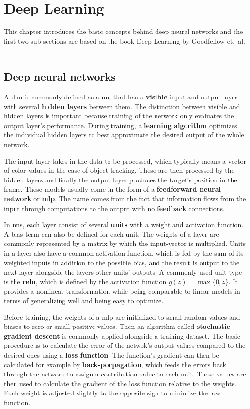 \section{Deep Learning}

This chapter introduces the basic concepts behind deep neural networks and the 
first two sub-sections are based on the book Deep Learning by Goodfellow et.~al.
~\cite{DEEP_LEARNING}

\subsection{Deep neural networks}

A \ac{dnn} is commonly defined as a \ac{nn}, that has a \textbf{visible} input and
output layer with several \textbf{hidden layers} between them. The distinction between
visible and hidden layers is important because training of the network only evaluates
the output layer's performance. During training, a \textbf{learning algorithm} optimizes
the individual hidden layers to best approximate the desired output of the whole network.

The input layer takes in the data to be processed, which typically means a vector of
color values in the case of object tracking. These are then processed by the hidden
layers and finally the output layer produces the target's position in the frame. These
models usually come in the form of a \textbf{feedforward neural network} or
\textbf{\ac{mlp}}. The name comes from the fact that information flows from the input
through computations to the output with no \textbf{feedback} connections.

In \ac{nn}s, each layer consist of several \textbf{units} with a weight and activation
function. A bias-term can also be defined for each unit. The weights of a layer are
commonly represented by a matrix by which the input-vector is multiplied. Units in a
layer also have a common activation function, which is fed by the sum of its weighted
inputs in addition to the possible bias, and the result is output to the next layer
alongside the layers other units' outputs. A commonly used unit type is the \textbf{\ac{relu}},
which is defined by the activation function $g (z) = \max\{0,z\}$. It provides a
nonlinear transformation while being comparable to linear models in terms of generalizing
well and being easy to optimize.

Before training, the weights of a \ac{mlp} are initialized to small random values and 
biases to zero or small positive values. Then an algorithm called \textbf{stochastic
gradient descent} is commonly applied alongside a training dataset. The basic procedure
is to calculate the error of the netwok's output values compared to the desired ones 
using a \textbf{loss function}. The function's gradient can then be calculated for
example by \textbf{back-porpagation}, which feeds the errors back through the network
to assign a contribution value to each unit. These values are then used to calculate
the gradient of the loss function relative to the weights. Each weight is adjusted
slightly to the opposite sign to minimize the loss function.

